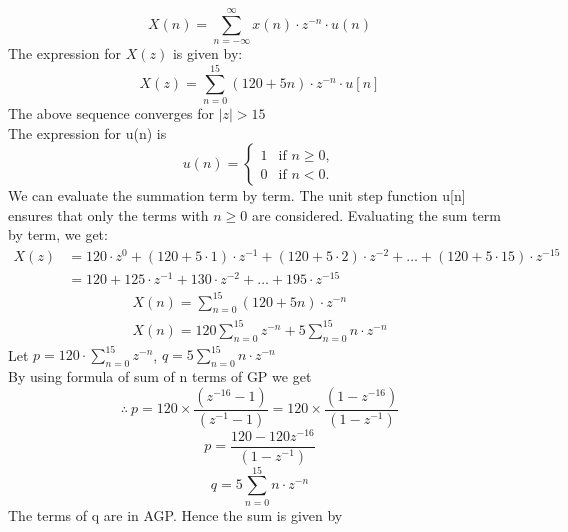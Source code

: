 \documentclass[journal,12pt,onecolumn]{IEEEtran}
\theoremstyle{remark}
\begin{document}
\[
X(n) = \sum_{n=-\infty}^{\infty} x(n) \cdot z^{-n}\cdot u(n)
\]
The expression for \(X(z)\) is given by:
\[
X(z) = \sum_{n=0}^{15} (120 + 5n) \cdot z^{-n} \cdot u[n]
\]
The above sequence  converges for \(\lvert z \rvert > 15\)\\
The expression for u(n) is 
\[ u(n) = \begin{cases}
    1 & \text{if } n \geq 0, \\
    0 & \text{if } n < 0.
\end{cases} \]
We can evaluate the summation term by term. The unit step function u[n] ensures that only the terms with \(n \geq 0\) are considered.
Evaluating the sum term by term, we get:
\[
\begin{aligned}
X(z) &= 120 \cdot z^0 + (120 + 5 \cdot 1) \cdot z^{-1} + (120 + 5 \cdot 2) \cdot z^{-2} + \ldots + (120 + 5 \cdot 15) \cdot z^{-15} \\
&= 120 + 125 \cdot z^{-1} + 130 \cdot z^{-2} + \ldots + 195 \cdot z^{-15}
\end{aligned}
\]
\[
\begin{aligned}
   X(n) = \sum_{n=0}^{15} (120+5n) \cdot z^{-n}\\
   X(n) = 120\sum_{n=0}^{15}z^{-n}+5\sum_{n=0}^{15}n\cdot z^{-n}
\end{aligned}
\]
Let \(p = 120 \cdot \sum_{n=0}^{15} z^{-n}\), \(q = 5\sum_{n=0}^{15}n\cdot z^{-n}\)\\
By using formula of sum of n terms of GP we get
\[\therefore\ p=120\times \frac{ ( z^{-16}-1)}{(z^{-1}-1)}=120\times \frac{ (1 - z^{-16})}{(1 - z^{-1})} \]
\[p=\frac{120-120 z^{-16}}{(1 - z^{-1})}\]
\[
   q= 5\sum_{n=0}^{15}n\cdot z^{-n}
\]
The terms of q are in AGP. Hence the sum is given by
\end{document}
